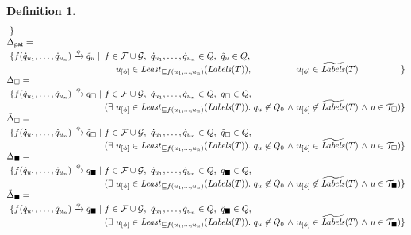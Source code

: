 \documentclass[copyright,creativecommons]{eptcs}
\newtheorem{definition}{Definition}
\newcommand{\cF}{\mathcal{F}}
\newcommand{\cG}{\mathcal{G}}
\newcommand{\Terms}{{\mathcal{T}}}
\newcommand{\TwC}[2]{{#1}_{[#2]}}
\newcommand{\Maximal}[1][]{{\mathit{Least}_{\sqsubseteq #1}}}
\newcommand{\Labels}{{\mathit{Labels}}}
\newcommand{\Initials}{\widetilde{\Labels}}
\begin{document}
\begin{definition}
\[\begin{array}{@{}l@{~}l@{~}l@{~}l@{~}c@{~}c@{~}c@{~}c@{~}c@{}r@{}}
   & \}
   \\
\lefteqn{\tilde{\Delta}_{\mathsf{pat}} = }
  \\
  &
   \{ f(\dot{q}_{u_1},\ldots,\dot{q}_{u_n}) \xrightarrow[]{\phi} \tilde{q}_u
   \mid &
   \multicolumn{5}{@{}l@{}}{
   f \in \cF\cup\cG,
   ~
   \dot{q}_{u_1},\ldots,\dot{q}_{u_n} \in Q, 
   ~
   \tilde{q}_u \in Q,
   }
   &
   \\
  & &
   & \TwC{u}{\phi} \in
   \Maximal[f(u_1,\ldots,u_n)](\Labels(T)),
   &
&  & 
   \TwC{u}{\phi} \in \Initials(T) 
   & & 
   & \}
   \\
\lefteqn{\Delta_\square = }
  \\
  &
   \{ f(\dot{q}_{u_1},\ldots,\dot{q}_{u_n}) \xrightarrow[]{\phi} q_\square
   \mid &
   \multicolumn{5}{@{}l@{}}{
   f \in \cF\cup\cG,
   ~
   \dot{q}_{u_1},\ldots,\dot{q}_{u_n} \in Q, 
   ~
   q_\square \in Q, } 
   &
   \\
  & &
   (\exists & \TwC{u}{\phi} \in
   \Maximal[f(u_1,\ldots,u_n)](\Labels(T)).
   &
   q_u \not\in Q_0
   & \wedge & 
   \TwC{u}{\phi} \not\in \Initials(T) 
   & \wedge & 
   u \in \Terms_\square 
   & ) \}
   \\
\lefteqn{\tilde{\Delta}_\square = }
  \\
  &
   \{ f(\dot{q}_{u_1},\ldots,\dot{q}_{u_n}) \xrightarrow[]{\phi} \tilde{q}_\square
   \mid &
   \multicolumn{5}{@{}l@{}}{
   f \in \cF\cup\cG,
   ~
   \dot{q}_{u_1},\ldots,\dot{q}_{u_n} \in Q, 
   ~
   \tilde{q}_\square \in Q, } 
   &
   \\
  & &
   (\exists & \TwC{u}{\phi} \in
   \Maximal[f(u_1,\ldots,u_n)](\Labels(T)).
   &
   q_u \not\in Q_0
   & \wedge & 
   \TwC{u}{\phi} \in \Initials(T) 
   & \wedge & 
   u \in \Terms_\square 
   & ) \}
   \\
\lefteqn{\Delta_\blacksquare = }
  \\
  &
   \{ f(\dot{q}_{u_1},\ldots,\dot{q}_{u_n}) \xrightarrow[]{\phi} q_\blacksquare
   \mid &
   \multicolumn{5}{@{}l@{}}{
   f \in \cF\cup\cG,
   ~
   \dot{q}_{u_1},\ldots,\dot{q}_{u_n} \in Q, 
   ~
   q_\blacksquare \in Q, } 
   &
   \\
  & &
   (\exists & \TwC{u}{\phi} \in
   \Maximal[f(u_1,\ldots,u_n)](\Labels(T)).
   &
   q_u \not\in Q_0
   & \wedge & 
   \TwC{u}{\phi} \not\in \Initials(T) 
   & \wedge & 
   u \in \Terms_\blacksquare 
   & ) \}
   \\
\lefteqn{\tilde{\Delta}_\blacksquare = }
  \\
  &
   \{ f(\dot{q}_{u_1},\ldots,\dot{q}_{u_n}) \xrightarrow[]{\phi} \tilde{q}_\blacksquare
   \mid &
   \multicolumn{5}{@{}l@{}}{
   f \in \cF\cup\cG,
   ~
   \dot{q}_{u_1},\ldots,\dot{q}_{u_n} \in Q, 
   ~
   \tilde{q}_\blacksquare \in Q, } 
   &
   \\
  & &
   (\exists & \TwC{u}{\phi} \in
   \Maximal[f(u_1,\ldots,u_n)](\Labels(T)).
   &
   q_u \not\in Q_0
   & \wedge & 
   \TwC{u}{\phi} \in \Initials(T) 
   & \wedge & 
   u \in \Terms_\blacksquare 
   & ) \}
   \\
\end{array}
\]
\end{definition}
\end{document}
